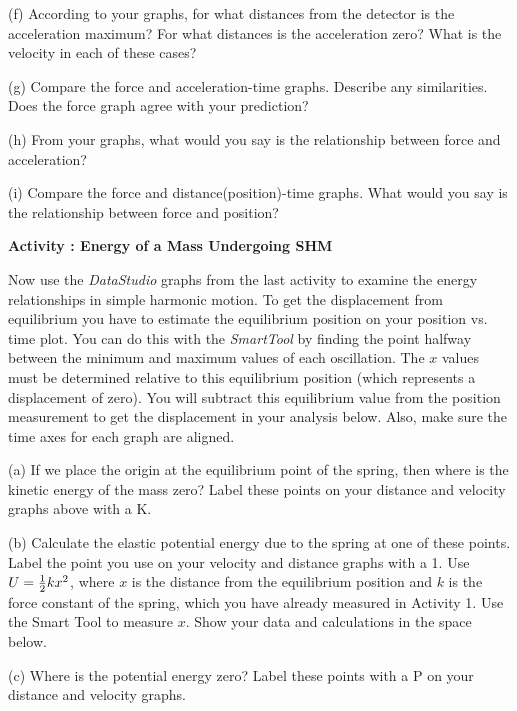 \newpage

(f) According to your graphs, for what distances from the detector is the acceleration
maximum? For what distances is the acceleration zero? What is the velocity in
each of these cases?
\vspace{20mm}

(g) Compare the force and acceleration-time graphs. Describe any similarities.
Does the force graph agree with your prediction?
\vspace{20mm}

(h) From your graphs, what would you say is the relationship between force and
acceleration? 
\vspace{20mm}

(i) Compare the force and distance(position)-time graphs. What would you say
is the relationship between force and position? 
\vspace{20mm}

\textbf{Activity  : Energy of a Mass Undergoing SHM }

Now use the {\it DataStudio} graphs from the last activity to examine the energy relationships
in simple harmonic motion. 
To get the displacement from equilibrium you have to estimate the equilibrium position
on your position vs. time plot.
You can do this with the {\it SmartTool} by finding the point halfway between the 
minimum and maximum values of each 
oscillation.
The $x$ values must be determined relative to this equilibrium position (which represents a displacement of zero).
You will subtract this equilibrium value from the position measurement to get the displacement in
your analysis below.
Also, make sure the time axes for each graph are aligned.

(a) If we place the origin at the equilibrium point of the spring,
then where is the kinetic energy of the mass zero? Label these points
on your distance and velocity graphs above with a K.

(b) Calculate the elastic potential energy due to the spring at one of these
points. Label the point you use on your velocity and distance graphs with a
1. Use $U = {1\over 2}kx^{2}$, where 
$x$ is the distance from the equilibrium position
and $k$ is the force constant of the spring, 
which you have already measured in Activity 1. Use
the Smart Tool to measure $x$. Show your data and calculations in the space below. 
\vspace{20mm}

(c) Where is the potential energy zero? Label these points with a P
on your distance and velocity graphs.

